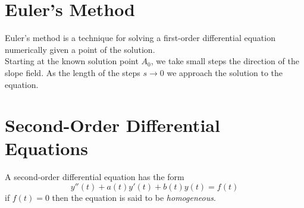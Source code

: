 \documentclass{article}
\begin{document}
\wrapfill

\section{Euler's Method}

Euler's method is a technique for solving a 
first-order differential equation numerically given a point of the solution.
\\
Starting at the known solution point \(A_0\), we take small steps the direction
of the slope field. As the length of the steps \(s \to 0\)
we approach the solution to the equation. \\

\pagebreak

\section{Second-Order Differential Equations}

A second-order differential equation has the form
\[
    y''(t)+a(t)y'(t)+b(t)y(t)=f(t)
\]
if \(f(t)=0\) then the equation is said to be \textit{homogeneous}.

\end{document}
